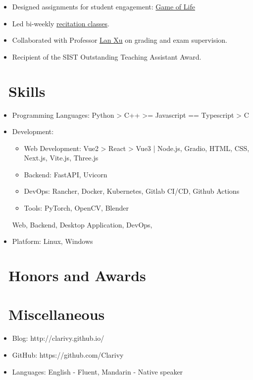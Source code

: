 \documentclass{resume}
\begin{document}

\begin{itemize}
  \item Designed assignments for student engagement: \href{https://github.com/Clarivy/GameOfLife-Homework}{Game of Life}
  \item Led bi-weekly \href{https://github.com/GKxxQAQ/CS100-recitations-spring2023}{recitation classes}.
  \item Collaborated with Professor \href{https://www.xu-lan.com/}{Lan Xu} on grading and exam supervision.
  \item Recipient of the SIST Outstanding Teaching Assistant Award.
\end{itemize}


\section{\faCogs\ Skills}
\begin{itemize}[parsep=0.5ex]
  \item Programming Languages: Python > C++ >= Javascript == Typescript > C
  \item Development:
        \begin{itemize}
          \item Web Development: Vue2 > React > Vue3 | Node.js, Gradio, HTML, CSS, Next.js, Vite.js, Three.js
          \item Backend: FastAPI, Uvicorn
          \item DevOps: Rancher, Docker, Kubernetes, Gitlab CI/CD, Github Actions
          \item Tools: PyTorch, OpenCV, Blender
        \end{itemize}
        Web, Backend, Desktop Application, DevOps,
  \item Platform: Linux, Windows
\end{itemize}

\section{\faHeartO\ Honors and Awards}

\section{\faInfo\ Miscellaneous}
\begin{itemize}[parsep=0.5ex]
  \item Blog: http://clarivy.github.io/
  \item GitHub: https://github.com/Clarivy
  \item Languages: English - Fluent, Mandarin - Native speaker
\end{itemize}

%
%
\end{document}
